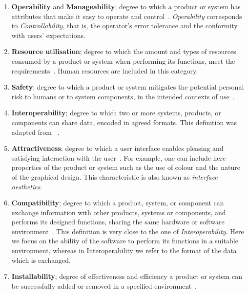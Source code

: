 \begin{enumerate}
    \item \textbf{Operability} and \textbf{Manageability}; degree to which a product or system has attributes that make it easy to operate and control~\cite{iso_25010_2011_2017}. \textit{Operability} corresponds to \textit{Controllability}, that is, the operator's error tolerance and the conformity with users' expectations.

    \item \textbf{Resource utilisation}; degree to which the amount and types of resources consumed by a product or system when performing its functions, meet the requirements~\cite{iso_25010_2011_2017}. Human resources are included in this category.

    \item \textbf{Safety}; degree to which a product or system mitigates the potential personal risk to humans or to system components, in the intended contexts of use~\cite{iso_25010_2011_2017}.

    \item \textbf{Interoperability}; degree to which two or more systems, products, or components can share data, encoded in agreed formats. This definition was adapted from ~\cite{iso_iec_24765_2017}.

    \item \textbf{Attractiveness}; degree to which a user interface enables pleasing and satisfying interaction with the user~\cite{iso_25010_2011_2017}. For example, one can include here properties of the product or system such as the use of colour and the nature of the graphical design. This characteristic is also known as \textit{interface aesthetics}.

    \item \textbf{Compatibility}; degree to which a product, system, or component can exchange information with other products, systems or components, and performs its designed functions, sharing the same hardware or software environment~\cite{iso_25010_2011_2017}. This definition is very close to the one of \textit{Interoperability}. Here we focus on the ability of the software to perform its functions in a suitable environment, whereas in Interoperability we refer to the format of the data which is exchanged.

    \item \textbf{Installability}; degree of effectiveness and efficiency a product or system can be successfully added or removed in a specified environment~\cite{iso_25010_2011_2017}.


\end{enumerate}
